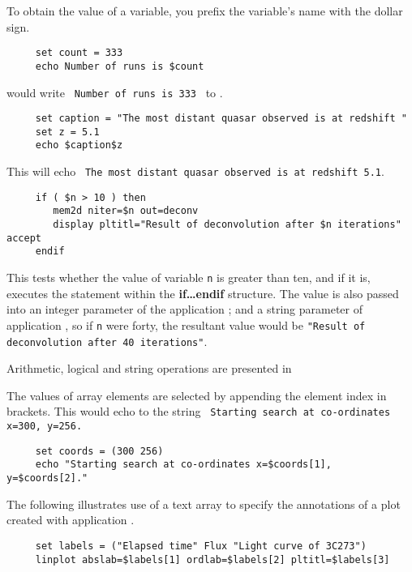 To obtain the value of a variable, you prefix the variable's name with
the dollar sign.

\small
\begin{verbatim}
     set count = 333
     echo Number of runs is $count
\end{verbatim}
\normalsize
would write ~{\tt Number of runs is 333}~ to .

\small
\begin{verbatim}
     set caption = "The most distant quasar observed is at redshift "
     set z = 5.1
     echo $caption$z
\end{verbatim}
\normalsize
This will echo ~{\tt The most distant quasar observed is at redshift 5.1}.

\small
\begin{verbatim}
     if ( $n > 10 ) then
        mem2d niter=$n out=deconv
        display pltitl="Result of deconvolution after $n iterations" accept
     endif
\end{verbatim}
\normalsize
This tests whether the value of variable {\tt n} is greater than ten, and
if it is, executes the statement within the {\bf if\ldots endif}
structure.  The value is also passed into an integer parameter of the
application ; and a string parameter of application 
, so if {\tt n} were forty, the resultant value would
be {\tt "Result of deconvolution after 40 iterations"}.

Arithmetic, logical and string operations are presented in

The values of array elements are selected by appending the element
index in brackets.  This would echo to  the string ~{\tt Starting search at
co-ordinates x=300, y=256.}

\small
\begin{verbatim}
     set coords = (300 256)
     echo "Starting search at co-ordinates x=$coords[1], y=$coords[2]."
\end{verbatim}
\normalsize

The following illustrates use of a text array to specify the
annotations of a plot created with application 
.
\small
\begin{verbatim}
     set labels = ("Elapsed time" Flux "Light curve of 3C273")
     linplot abslab=$labels[1] ordlab=$labels[2] pltitl=$labels[3]
\end{verbatim}
\normalsize

